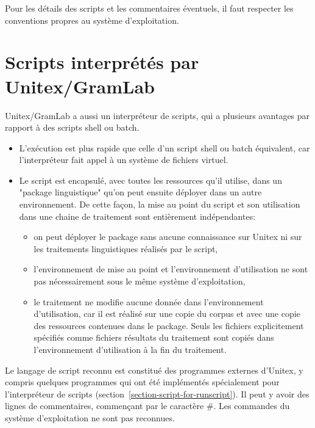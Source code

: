 \noindent Pour les détails des scripts et les commentaires éventuels, il faut respecter les conventions
propres au système d'exploitation.



\section{Scripts interprétés par Unitex/GramLab}
\label{section-unitex-scripts}

Unitex/GramLab a aussi un interpréteur de scripts, qui a plusieurs avantages par rapport à des scripts
shell ou batch.
\begin{itemize}
    \item L'exécution est plus rapide que celle d'un script shell ou batch équivalent, car l'interpréteur fait
appel à un système de fichiers virtuel.
    \item Le script est encapsulé, avec toutes les ressources qu'il utilise, dans un "package linguistique"
qu'on peut ensuite déployer dans un autre environnement. De cette façon, la mise au point du script
et son utilisation dans une chaine de traitement sont entièrement indépendantes:
\begin{itemize}
    \item on peut déployer le package sans aucune connaissance sur Unitex ni sur les traitements
linguistiques réalisés par le script,
    \item l'environnement de mise au point et l'environnement d'utilisation ne sont pas nécessairement
sous le même système d'exploitation,
    \item le traitement ne modifie aucune donnée dans l'environnement d'utilisation, car il est réalisé
sur une copie du corpus et avec une copie des ressources contenues dans le package. Seuls les fichiers
explicitement spécifiés comme fichiers résultats du traitement sont copiés dans l'environnement
d'utilisation à la fin du traitement.
\end{itemize}
\end{itemize}

\noindent Le langage de script reconnu est constitué des programmes externes d'Unitex, y compris
quelques programmes qui ont été implémentés spécialement pour l'interpréteur de scripts
(section~\ref{section-script-for-runscript}). Il peut y avoir des lignes de commentaires, commençant
par le caractère \#. Les commandes du système d'exploitation ne sont pas reconnues.

